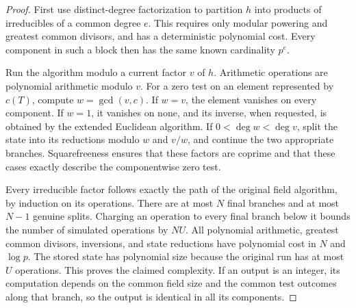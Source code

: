 \documentclass[11pt]{article}
\theoremstyle{definition}
\theoremstyle{remark}
\begin{document}
\begin{proof}
First use distinct-degree factorization to partition \(h\) into
products of irreducibles of a common degree \(e\). This requires
only modular powering and greatest common divisors, and has a
deterministic polynomial cost. Every component in such a block
then has the same known cardinality \(p^e\).

Run the algorithm modulo a current factor \(v\) of \(h\).
Arithmetic operations are polynomial arithmetic modulo \(v\).
For a zero test on an element represented by \(c(T)\), compute
\(w=\gcd(v,c)\). If \(w=v\), the element vanishes on every
component. If \(w=1\), it vanishes on none, and its inverse,
when requested, is obtained by the extended Euclidean algorithm.
If \(0<\deg w<\deg v\), split the state into its reductions
modulo \(w\) and \(v/w\), and continue the two appropriate
branches. Squarefreeness ensures that these factors are coprime
and that these cases exactly describe the componentwise zero test.

Every irreducible factor follows exactly the path of the original
field algorithm, by induction on its operations. There are at
most \(N\) final branches and at most \(N-1\) genuine splits.
Charging an operation to every final branch below it bounds the
number of simulated operations by \(NU\). All polynomial
arithmetic, greatest common divisors, inversions, and state
reductions have polynomial cost in \(N\) and \(\log p\).
The stored state has polynomial size because the original run
has at most \(U\) operations. This proves the claimed complexity.
If an output is an integer, its computation depends on the
common field size and the common test outcomes along that
branch, so the output is identical in all its components.
\end{proof}
\end{document}
